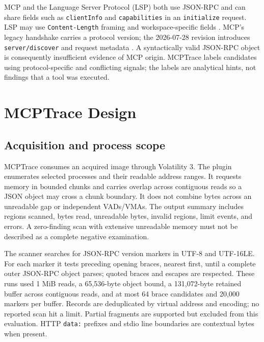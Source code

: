 \documentclass[conference,10pt]{IEEEtran}
\begin{document}
MCP and the Language Server Protocol (LSP) both use JSON-RPC and can share fields such as \texttt{clientInfo} and \texttt{capabilities} in an \texttt{initialize} request. LSP may use \texttt{Content-Length} framing and workspace-specific fields \cite{lsp}. MCP's legacy handshake carries a protocol version; the 2026-07-28 revision introduces \texttt{server/discover} and request metadata \cite{mcp-spec}. A syntactically valid JSON-RPC object is consequently insufficient evidence of MCP origin. MCPTrace labels candidates using protocol-specific and conflicting signals; the labels are analytical hints, not findings that a tool was executed.

\section{MCPTrace Design}
\subsection{Acquisition and process scope}
MCPTrace consumes an acquired image through Volatility 3. The plugin enumerates selected processes and their readable address ranges. It requests memory in bounded chunks and carries overlap across contiguous reads so a JSON object may cross a chunk boundary. It does not combine bytes across an unreadable gap or independent VADs/VMAs. The output summary includes regions scanned, bytes read, unreadable bytes, invalid regions, limit events, and errors. A zero-finding scan with extensive unreadable memory must not be described as a complete negative examination.

The scanner searches for JSON-RPC version markers in UTF-8 and UTF-16LE. For each marker it tests preceding opening braces, nearest first, until a complete outer JSON-RPC object parses; quoted braces and escapes are respected. These runs used 1 MiB reads, a 65,536-byte object bound, a 131,072-byte retained buffer across contiguous reads, and at most 64 brace candidates and 20,000 markers per buffer. Records are deduplicated by virtual address and encoding; no reported scan hit a limit. Partial fragments are supported but excluded from this evaluation. HTTP \texttt{data:} prefixes and stdio line boundaries are contextual bytes when present.
\end{document}
